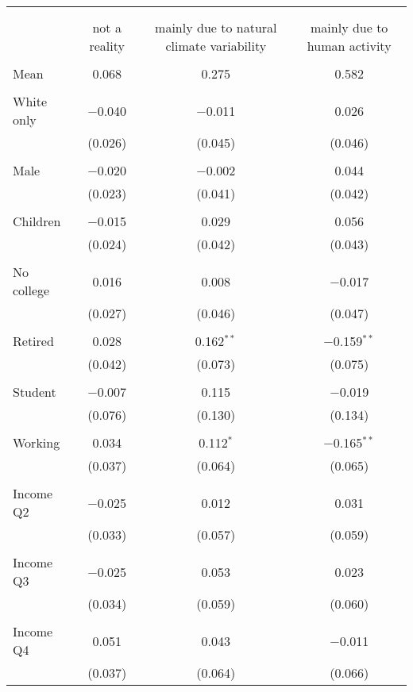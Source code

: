 
\begin{tabular}{@{\extracolsep{5pt}}lccc} 
\\[-1.8ex]\hline 
\hline \\[-1.8ex] 
\\[-1.8ex] & not a reality & mainly due to natural climate variability & mainly due to human activity \\ 
\hline \\[-1.8ex] 
 Mean & 0.068 & 0.275 & 0.582  \\ \hline \\[-1.8ex] White only & $-$0.040 & $-$0.011 & 0.026 \\ 
  & (0.026) & (0.045) & (0.046) \\ 
  & & & \\ 
 Male & $-$0.020 & $-$0.002 & 0.044 \\ 
  & (0.023) & (0.041) & (0.042) \\ 
  & & & \\ 
 Children & $-$0.015 & 0.029 & 0.056 \\ 
  & (0.024) & (0.042) & (0.043) \\ 
  & & & \\ 
 No college & 0.016 & 0.008 & $-$0.017 \\ 
  & (0.027) & (0.046) & (0.047) \\ 
  & & & \\ 
 Retired & 0.028 & 0.162$^{**}$ & $-$0.159$^{**}$ \\ 
  & (0.042) & (0.073) & (0.075) \\ 
  & & & \\ 
 Student & $-$0.007 & 0.115 & $-$0.019 \\ 
  & (0.076) & (0.130) & (0.134) \\ 
  & & & \\ 
 Working & 0.034 & 0.112$^{*}$ & $-$0.165$^{**}$ \\ 
  & (0.037) & (0.064) & (0.065) \\ 
  & & & \\ 
 Income Q2 & $-$0.025 & 0.012 & 0.031 \\ 
  & (0.033) & (0.057) & (0.059) \\ 
  & & & \\ 
 Income Q3 & $-$0.025 & 0.053 & 0.023 \\ 
  & (0.034) & (0.059) & (0.060) \\ 
  & & & \\ 
 Income Q4 & 0.051 & 0.043 & $-$0.011 \\ 
  & (0.037) & (0.064) & (0.066) \\ 

\end{tabular}
